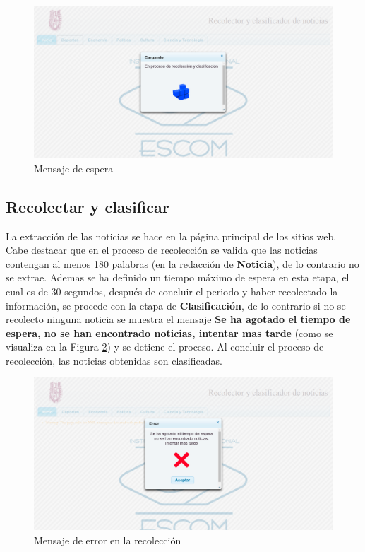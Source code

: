 \begin{figure}[H]
\centering
\includegraphics[scale=0.25]{imagenes/mensajeEspera.png}
\caption{Mensaje de espera}
\label{fig:loading}
\end{figure}


\subsection{Recolectar y clasificar}

La extracción de las noticias se hace en la página principal de los sitios web. Cabe destacar que en el proceso de recolección se valida que las noticias contengan al menos 180 palabras (en la redacción de \textbf{Noticia}), de lo contrario no se extrae. Ademas se ha definido un tiempo máximo de espera en esta etapa, el cual es de 30 segundos, después de concluir el periodo y haber recolectado la información, se procede con la etapa de \textbf{Clasificación}, de lo contrario si no se recolecto ninguna noticia se muestra el mensaje \textbf{Se ha agotado el tiempo de espera, no se han encontrado noticias, intentar mas tarde} (como se visualiza en la Figura \ref{fig:notNoRec}) y se detiene el proceso. Al concluir el proceso de recolección, las noticias obtenidas son clasificadas.

\begin{figure}[H]
\centering
\includegraphics[scale=0.25]{imagenes/errorConectividad.png}
\caption{Mensaje de error en la recolección}
\label{fig:notNoRec}
\end{figure}


